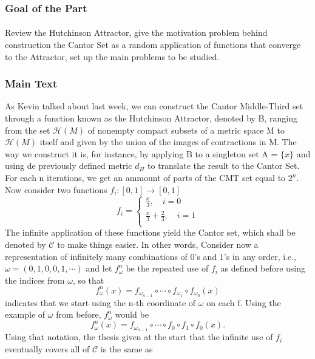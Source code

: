 \documentclass{article}
\begin{document}
\subsubsection{Goal of the Part}
 \paragraph{} Review the Hutchinson Attractor, give the motivation problem behind construction the Cantor Set as a random application of functions
that converge to the Attractor, set up the main problems to be studied.
\subsubsection{Main Text}
  As Kevin talked about last week, we can construct the Cantor Middle-Third set through a function known as the Hutchinson Attractor, denoted by B, ranging
from the set $\mathcal{H}(M)$ of nonempty compact subsets of a metric space M to $\mathcal{H}(M)$ itself and given by the union of the images of 
contractions in M. The way we construct it is, for instance, by applying B to a singleton set A = $\{x\}$ and using de previously defined metric $d_{H}$ to translate
the result to the Cantor Set. For each n iterations, we get an ammount of parts of the CMT set equal to $2^{n}.$ 
Now consider two functions $f_{i}:[0,1]\rightarrow [0, 1]$
  $$
    f_{i} = \left\{\begin{array}{ll}
        \frac{x}{3}, \quad i=0\\
        \frac{x}{3}+\frac{2}{3}, \quad i=1\\
      \end{array}\right.
  $$
  The infinite application of these functions yield the Cantor set, which shall be denoted by $\mathcal{C}$ to make things easier. In other words,
Consider now a representation of infinitely many combinations of 0's and 1's in any order, i.e., $\omega = (0, 1, 0, 0, 1, \cdots)$ and
let $f_{\omega}^{n}$ be the repeated use of $f_{i}$ as defined before using the indices from $\omega$, so that
  $$
  f_{\omega}^{n}(x) = f_{\omega_{n-1}}\circ{\cdots}\circ{f_{\omega_{1}}}\circ{f_{\omega_{0}}}(x)
  $$
  indicates that we start using the n-th coordinate of $\omega$ on each f. Using the example of $\omega$ from before, $f_{\omega}^{n}$
  would be
  $$
    f_{\omega}^{n}(x) = f_{\omega_{n-1}}\circ{\cdots}\circ{f_{0}}\circ{f_{1}}\circ{f_{0}}(x).
  $$
  Using that notation, the thesis given at the start that the infinite use of $f_{i}$ eventually covers all of $\mathcal{C}$ is the same as
\end{document}
